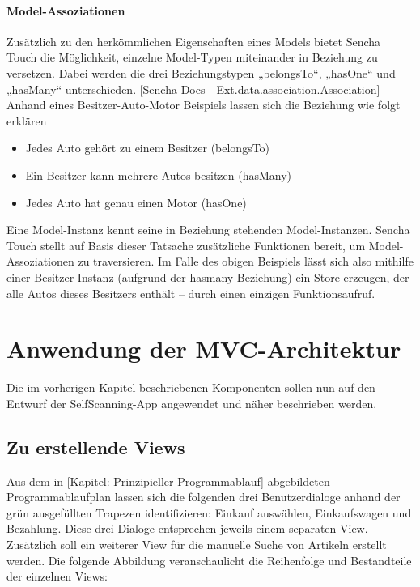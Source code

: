 \paragraph{Model-Assoziationen}
Zusätzlich zu den herkömmlichen Eigenschaften eines Models bietet Sencha Touch die Möglichkeit, einzelne Model-Typen miteinander in Beziehung zu versetzen. Dabei werden die drei Beziehungstypen „belongsTo“, „hasOne“ und „hasMany“ unterschieden. [Sencha Docs - Ext.data.association.Association] Anhand eines Besitzer-Auto-Motor Beispiels lassen sich die Beziehung wie folgt erklären
\begin{itemize}
	\item Jedes Auto gehört zu einem Besitzer (belongsTo)
	\item Ein Besitzer kann mehrere Autos besitzen (hasMany)
	\item Jedes Auto hat genau einen Motor (hasOne)
\end{itemize}
Eine Model-Instanz kennt seine in Beziehung stehenden Model-Instanzen. Sencha Touch stellt auf Basis dieser Tatsache zusätzliche Funktionen bereit, um Model-Assoziationen zu traversieren. Im Falle des obigen Beispiels lässt sich also mithilfe einer Besitzer-Instanz (aufgrund der hasmany-Beziehung) ein Store erzeugen, der alle Autos dieses Besitzers enthält – durch einen einzigen Funktionsaufruf.

\section{Anwendung der MVC-Architektur}
Die im vorherigen Kapitel beschriebenen Komponenten sollen nun auf den Entwurf der SelfScanning-App angewendet und näher beschrieben werden.

\subsection{Zu erstellende Views}
Aus dem in [Kapitel: Prinzipieller Programmablauf] abgebildeten Programmablaufplan lassen sich die folgenden drei Benutzerdialoge anhand der grün ausgefüllten Trapezen identifizieren: Einkauf auswählen, Einkaufswagen und Bezahlung. Diese drei Dialoge entsprechen jeweils einem separaten View. Zusätzlich soll ein weiterer View für die manuelle Suche von Artikeln erstellt werden. Die folgende Abbildung veranschaulicht die Reihenfolge und Bestandteile der einzelnen Views:


